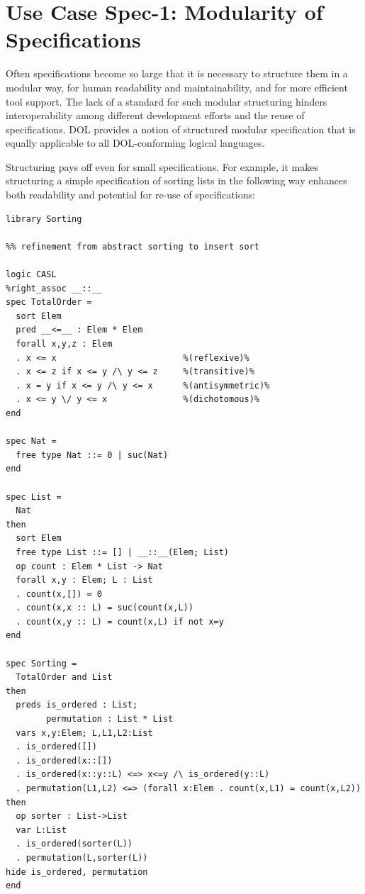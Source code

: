 \documentclass[10pt,fleqn,%
\ifpretendfinal
final%
\else
draft%
\fi,
]{scrreprt}
\begin{document}

\section{Use Case Spec-1: Modularity of Specifications}\label{spec-1}
Often specifications become so large that it is necessary to structure
them in a modular way, for human readability and maintainability, and for more efficient tool support. The lack of a standard for such
modular structuring hinders interoperability among different
development efforts and the reuse of specifications.  DOL provides a
notion of structured modular specification that is equally applicable
to all DOL-conforming logical languages.

Structuring pays off even for small specifications. For example, it makes
structuring a simple specification of sorting lists in the 
following way enhances both readability and potential for re-use
of specifications:

\begin{lstlisting}[basicstyle=\ttfamily\footnotesize,language=dolText,morekeywords={sort, ops, refinement, free,spec type, assoc, unit,props,op,spec,refined, via,generated, then,ObjectProperty,Class,DisjointUnionOf,SubClassOf,Characteristics,Transitive,Asymmetric,SubPropertyOf,DisjointClasses,EquivalentTo,inverse,only,forall,iff,if,or,exists,distributed,from},escapechar=@,mathescape]	
library Sorting

%% refinement from abstract sorting to insert sort

logic CASL
%right_assoc __::__
spec TotalOrder =
  sort Elem
  pred __<=__ : Elem * Elem
  forall x,y,z : Elem
  . x <= x                         %(reflexive)%
  . x <= z if x <= y /\ y <= z     %(transitive)%
  . x = y if x <= y /\ y <= x      %(antisymmetric)%
  . x <= y \/ y <= x               %(dichotomous)%
end

spec Nat =
  free type Nat ::= 0 | suc(Nat)
end

spec List =
  Nat
then
  sort Elem
  free type List ::= [] | __::__(Elem; List)
  op count : Elem * List -> Nat
  forall x,y : Elem; L : List
  . count(x,[]) = 0
  . count(x,x :: L) = suc(count(x,L))
  . count(x,y :: L) = count(x,L) if not x=y
end

spec Sorting =
  TotalOrder and List
then
  preds is_ordered : List;
        permutation : List * List
  vars x,y:Elem; L,L1,L2:List
  . is_ordered([])
  . is_ordered(x::[])
  . is_ordered(x::y::L) <=> x<=y /\ is_ordered(y::L)
  . permutation(L1,L2) <=> (forall x:Elem . count(x,L1) = count(x,L2))
then
  op sorter : List->List
  var L:List
  . is_ordered(sorter(L))
  . permutation(L,sorter(L))
hide is_ordered, permutation
end
\end{lstlisting}
\end{document}
